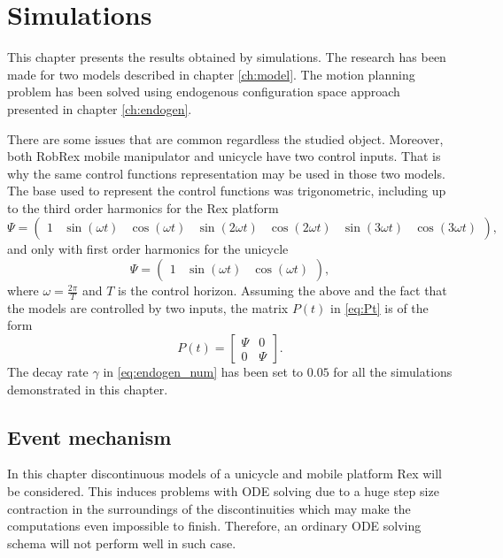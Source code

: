 \chapter{Simulations}
\label{ch:simul}
This chapter presents the results obtained by simulations. The research has been made for two models
described in chapter \ref{ch:model}. The motion planning problem has been solved using endogenous
configuration space approach presented in chapter \ref{ch:endogen}.

There are some issues that are common regardless the studied object. Moreover,
both RobRex mobile manipulator and unicycle have two control inputs. That is why
the same control functions representation may be used in those two models.
The base used to represent the control functions was trigonometric, including up to the third order
harmonics
for the Rex platform
\begin{equation}
\Psi=\begin{pmatrix}
1 & \sin(\omega t) & \cos(\omega t)& \sin(2\omega t) & \cos(2\omega t)& \sin(3\omega t) & \cos(3\omega t)
\end{pmatrix},
\end{equation}
and only with first order harmonics for the unicycle
\begin{equation}
\Psi=\begin{pmatrix}
1 & \sin(\omega t) & \cos(\omega t)
\end{pmatrix},
\end{equation}
where $\omega=\frac{2\pi}{T}$ and $T$ is the control horizon. Assuming the above and
the fact that the models are controlled by two inputs, the
matrix $P(t)$ in \eqref{eq:Pt} is of the form
\begin{equation}
P(t)=\begin{bmatrix}
\Psi & 0\\
0 & \Psi
\end{bmatrix}.
\end{equation}
The decay rate $\gamma$ in \eqref{eq:endogen_num} has been set to $0.05$ for all
the simulations demonstrated in this chapter.

\section{Event mechanism}
In this chapter discontinuous models of a unicycle and mobile platform Rex will be
considered. This induces problems with ODE solving
due to a huge step size contraction in the surroundings of the discontinuities which may
make the computations even impossible to finish. Therefore, an ordinary ODE solving
schema will not perform well in such case.


